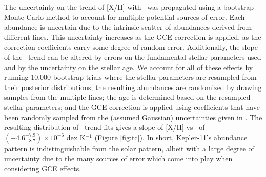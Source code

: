\documentclass[oneside]{emulateapj}
\begin{document}
The uncertainty on the trend of [X/H] with \tc\ was propagated using a bootstrap Monte Carlo method to account for multiple potential sources of error. Each abundance is uncertain due to the intrinsic scatter of abundances derived from different lines. This uncertainty increases as the GCE correction is applied, as the correction coefficients carry some degree of random error. Additionally, the slope of the \tc\ trend can be altered by errors on the fundamental stellar parameters used and by the uncertainty on the stellar age. We account for all of these effects by running 10,000 bootstrap trials where the stellar parameters are resampled from their posterior distributions; the resulting abundances are randomized by drawing samples from the multiple lines; the age is determined based on the resampled stellar parameters; and the GCE correction is applied using coefficients that have been randomly sampled from the (assumed Gaussian) uncertainties given in \citet{Spina2016b}. The resulting distribution of \tc\ trend fits gives a slope of [X/H] vs \tc\ of $(-4.6^{+7.9}_{-8.7}) \times 10^{-6}$ dex K$^{-1}$ (Figure  \ref{fig:tc}). In short, Kepler-11's abundance pattern is indistinguishable from the solar pattern, albeit with a large degree of uncertainty due to the many sources of error which come into play when considering GCE effects.

\end{document}
